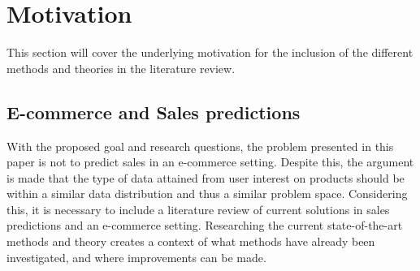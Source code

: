 \section{Motivation}
\label{section:BT:Motivation}

This section will cover the underlying motivation for the inclusion of the different methods and theories in the literature review.



\subsection{E-commerce and Sales predictions}
With the proposed goal and research questions, the problem presented in this paper is not to predict sales in an e-commerce setting.
Despite this, the argument is made that the type of data attained from user interest on products should be within a similar data distribution and thus a similar problem space.
Considering this, it is necessary to include a literature review of current solutions in sales predictions and an e-commerce setting.
Researching the current state-of-the-art methods and theory creates a context of what methods have already been investigated,
and where improvements can be made. 


